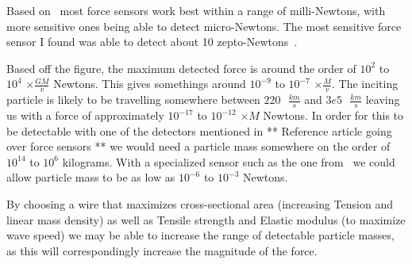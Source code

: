 \documentclass{report}
\begin{document}
Based on~\cite{WEI2015359} most force sensors work best within a range of milli-Newtons, with more sensitive ones being able to detect micro-Newtons.
The most sensitive force sensor I found was able to detect about 10 zepto-Newtons~\cite{Moser2013}. 

Based off the figure, the maximum detected force is around the order of $10^2$ to $10^4$ $\times \frac{G M}{v}$ Newtons. This gives somethings around $10^{-9}$ to $10^{-7}$ $\times \frac{M}{v}$. 
The inciting particle is likely to be travelling somewhere between $220 \text{ } \frac{km}{s}$ and $3e5 \text{ } \frac{km}{s}$ leaving us with a force of approximately $10^{-17}$ to $10^{-12}$ $\times M$ Newtons.
In order for this to be detectable with one of the detectors mentioned in ** Reference article going over force sensors ** we would need a particle mass somewhere on the order of $10^{14}$ to $10^{6}$ kilograms. 
With a specialized sensor such as the one from~\cite{Moser2013} we could allow particle mass to be as low as $10^{-6}$ to $10^{-3}$ Newtons. 

By choosing a wire that maximizes cross-sectional area (increasing Tension and linear mass density) as well as Tensile strength and Elastic modulus (to maximize wave speed) we may be able to increase the range of detectable 
particle masses, as this will correspondingly increase the magnitude of the force.

\printbibliography[]
\end{document}
